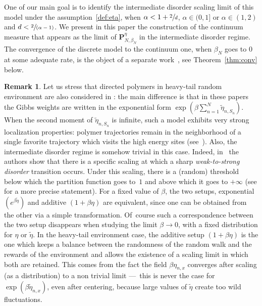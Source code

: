 \documentclass[JEP,XML,SOM,Unicode,published]{cedram}
\newcommand{\spfrac}[2]{\sfrac{#1}{(#2)}}
\theoremstyle{definition}
\newtheorem{rem}[theorem]{Remark}
\newcommand{\bP}{{\ensuremath{\mathbf P}} }
\let\gb\beta
\begin{document}
One of our main goal is to identify the intermediate disorder scaling limit of this model under the assumption~\eqref{def:eta}, when $\alpha<1+\sfrac{2}{d}$, \ie $\alpha\in (0,1]$ or $\alpha \in (1,2)$ and $d<\spfrac{2}{\alpha-1}$.
We present in this paper the construction of the continuum measure that appears as the limit of $\bP_{N,\gb_N}^{\eta}$ in the intermediate disorder regime. The convergence of the discrete model to the continuum one, when $\beta_N$ goes to $0$
at some adequate rate, is the object of a separate work~\cite{BL20_disc},
see Theorem~\ref{thm:conv} below.

\begin{rem}
\label{rem:weights}
Let us stress that
directed polymers in heavy-tail random environment are also considered in \cite{AL11,BT19,DZ16}:
the main difference is that in these papers the Gibbs weights are written in the exponential form $\exp(\gb \sum_{n=1}^N \tilde \eta_{n,S_n})$.
When the second moment of $\tilde \eta_{n,S_n}$ is infinite,
such a model exhibits very strong localization properties:
polymer trajectories remain in the neighborhood of a single favorite trajectory which visits the high energy sites (see~\cite{AL11,BT19}).
Also, the intermediate disorder regime is somehow trivial
in this case. Indeed, in~\cite{BT19} the authors show that there is a specific scaling at which
a sharp \emph{weak-to-strong disorder} transition occurs.
Under this scaling, there is a (random) threshold below which
the partition function goes to~$1$ and above which it goes to $+\infty$ (see \cite[Th.\,2.7-2.8]{BT19}
for a more precise statement).
For a fixed value of $\beta$, the two setups, exponential $(e^{\gb \tilde \eta})$ and additive $(1+\beta\eta)$ are equivalent, since one can be obtained from the other via a simple transformation. Of~course such a correspondence between the two setup disappears when studying the limit $\beta\to 0$, with a fixed distribution for $\eta$ or $\tilde \eta$. In the heavy-tail environment case, the additive setup $(1+\beta \eta)$ is the one which keeps a balance between the randomness of the random walk and the rewards of the environment and allows the existence of a scaling limit in which both are retained.
This comes from the fact the field $\gb \eta_{n,x}$ converges after scaling (as a distribution) to a non trivial limit ---~this is never the case for $\exp(\gb \tilde \eta_{n,x})$, even after centering, because large values of $\tilde \eta$ create too wild fluctuations.
\end{rem}

\end{document}

